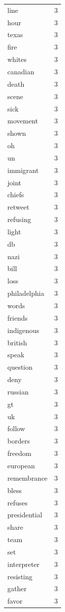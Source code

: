 \begin{tabular}{lr}
line & 3 \\
hour & 3 \\
texas & 3 \\
fire & 3 \\
whites & 3 \\
canadian & 3 \\
death & 3 \\
scene & 3 \\
sick & 3 \\
movement & 3 \\
shown & 3 \\
oh & 3 \\
un & 3 \\
immigrant & 3 \\
joint & 3 \\
chiefs & 3 \\
retweet & 3 \\
refusing & 3 \\
light & 3 \\
db & 3 \\
nazi & 3 \\
bill & 3 \\
loss & 3 \\
philadelphia & 3 \\
words & 3 \\
friends & 3 \\
indigenous & 3 \\
british & 3 \\
speak & 3 \\
question & 3 \\
deny & 3 \\
russian & 3 \\
gt & 3 \\
uk & 3 \\
follow & 3 \\
borders & 3 \\
freedom & 3 \\
european & 3 \\
remembrance & 3 \\
bless & 3 \\
refuses & 3 \\
presidential & 3 \\
share & 3 \\
team & 3 \\
set & 3 \\
interpreter & 3 \\
resisting & 3 \\
gather & 3 \\
favor & 3 \\

\end{tabular}
